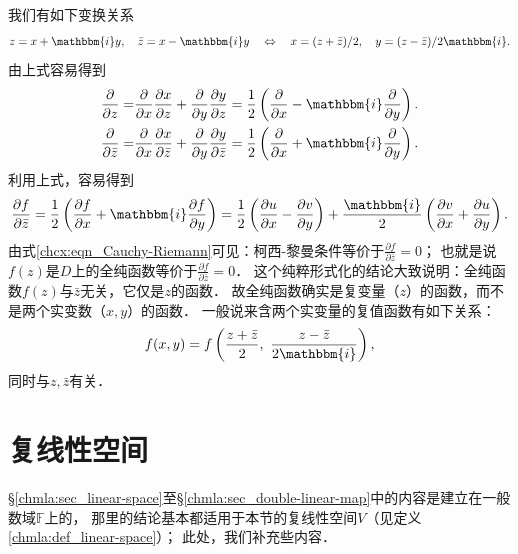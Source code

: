 我们有如下变换关系
\begin{equation}
    z= x+ \mathbbm{i} y,\quad \bar{z}= x - \mathbbm{i} y
    \quad \Leftrightarrow \quad
    x = (z+\bar{z})/2, \quad y=(z-\bar{z})/2\mathbbm{i}  .
\end{equation}
由上式容易得到
\begin{align}
    \frac{\partial }{\partial z}= &
       \frac{\partial }{\partial x} \frac{\partial x}{\partial z}
      +\frac{\partial }{\partial y} \frac{\partial y}{\partial z}
      =\frac{1}{2}\left( \frac{\partial }{\partial x} 
        -\mathbbm{i}\frac{\partial }{\partial y} \right) . \\
     \frac{\partial }{\partial \bar{z}}= &
     \frac{\partial }{\partial x} \frac{\partial x}{\partial \bar{z}}
     +\frac{\partial }{\partial y} \frac{\partial y}{\partial \bar{z}}
     =\frac{1}{2}\left( \frac{\partial }{\partial x} 
     +\mathbbm{i}\frac{\partial }{\partial y} \right) .   
\end{align}
利用上式，容易得到
\begin{equation}\label{chcx:eqn_Cauchy-Riemann-2}
    \frac{\partial f }{\partial \bar{z}}
    =\frac{1}{2}\left( \frac{\partial f}{\partial x} 
    +\mathbbm{i}\frac{\partial f}{\partial y} \right) 
    =\frac{1}{2}\left( \frac{\partial u}{\partial x} -\frac{\partial v}{\partial y}\right) 
    +\frac{\mathbbm{i}}{2}\left(\frac{\partial v}{\partial x} + \frac{\partial u}{\partial y} \right) .
\end{equation}
由式\eqref{chcx:eqn_Cauchy-Riemann}可见：柯西-黎曼条件等价于$\frac{\partial f }{\partial \bar{z}}=0$；
也就是说$f(z)$是$D$上的全纯函数等价于$\frac{\partial f }{\partial \bar{z}}=0$．
这个纯粹形式化的结论大致说明：全纯函数$f(z)$与$\bar{z}$无关，{\kaishu 它仅是$z$的函数}．
故全纯函数确实是{\kaishu 复变量}（$z$）的函数，而不是两个实变数（$x,y$）的函数．
一般说来含两个实变量的复值函数有如下关系：
\begin{equation}
    f(x,y)=f\left(\frac{z+\bar{z}}{2},\ \frac{z-\bar{z}}{2\mathbbm{i}}\right),
\end{equation}
同时与$z,\bar{z}$有关．



\section{复线性空间}\label{chcx:sec_cls}
\S\ref{chmla:sec_linear-space}至\S\ref{chmla:sec_double-linear-map}中的内容是建立在一般数域$\mathbb{F}$上的，
那里的结论基本都适用于本节的复线性空间$V$（见定义\ref{chmla:def_linear-space}）；
此处，我们补充些内容．

